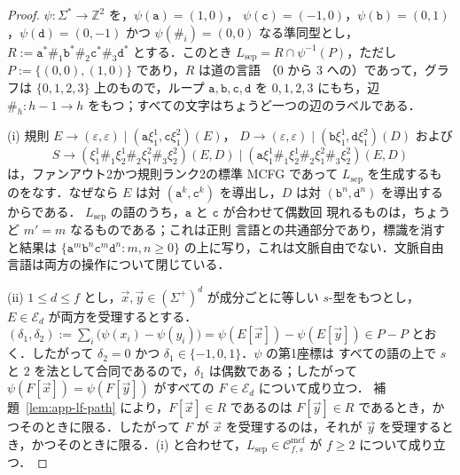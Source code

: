 \documentclass[11pt,a4paper]{ltjsarticle}
\numberwithin{equation}{section}
\theoremstyle{plain}
\theoremstyle{definition}
\theoremstyle{remark}
\newcommand{\Cmcf}[2]{\mathcal{C}^{\mathrm{mcf}}_{#1,#2}}
\newcommand{\tuple}[1]{\vec{#1}}
\newcommand{\eps}{\varepsilon}
\theoremstyle{plain}
\begin{document}
\begin{proof}
$\psi:\Sigma^*\to\mathbb Z^2$ を，$\psi(\mathtt a)=(1,0)$，
$\psi(\mathtt c)=(-1,0)$，$\psi(\mathtt b)=(0,1)$，$\psi(\mathtt d)=(0,-1)$ かつ
$\psi(\mathtt\#_i)=(0,0)$ なる準同型とし，
$R:=\mathtt a^*\mathtt\#_1\mathtt b^*\mathtt\#_2\mathtt c^*\mathtt\#_3\mathtt d^*$ とする．このとき
$L_{\mathrm{sep}}=R\cap\psi^{-1}(P)$，ただし $P:=\{(0,0),(1,0)\}$ であり，$R$ は道の言語
（$0$ から $3$ への）であって，グラフは $\{0,1,2,3\}$ 上のもので，ループ $\mathtt a,\mathtt b,\mathtt c,\mathtt d$
を $0,1,2,3$ にもち，辺 $\mathtt\#_h:h-1\to h$ をもつ；すべての文字はちょうど一つの辺のラベルである．

(i) 規則 $E\to(\eps,\eps)\mid(\mathtt a\xi_1^1,\mathtt c\xi_1^2)(E)$，
$D\to(\eps,\eps)\mid(\mathtt b\xi_1^1,\mathtt d\xi_1^2)(D)$ および
\[
 S\to(\xi_1^1\mathtt\#_1\xi_2^1\mathtt\#_2\xi_1^2\mathtt\#_3\xi_2^2)(E,D)\mid
 (\mathtt a\xi_1^1\mathtt\#_1\xi_2^1\mathtt\#_2\xi_1^2\mathtt\#_3\xi_2^2)(E,D)
\]
は，ファンアウト2かつ規則ランク2の標準 MCFG であって $L_{\mathrm{sep}}$ を生成するものをなす．なぜなら $E$
は対 $(\mathtt a^k,\mathtt c^k)$ を導出し，$D$ は対 $(\mathtt b^n,\mathtt d^n)$ を導出するからである．
$L_{\mathrm{sep}}$ の語のうち，$\mathtt a$ と $\mathtt c$ が合わせて偶数回
現れるものは，ちょうど $m'=m$ なるものである；これは正則
言語との共通部分であり，標識を消すと結果は
$\{\mathtt a^m\mathtt b^n\mathtt c^m\mathtt d^n:m,n\ge0\}$ の上に写り，これは文脈自由でない．文脈自由
言語は両方の操作について閉じている．

(ii) $1\le d\le f$ とし，$\tuple x,\tuple y\in(\Sigma^+)^d$ が成分ごとに等しい
$s$-型をもつとし，$E\in\mathcal E_d$ が両方を受理するとする．
$(\delta_1,\delta_2):=\sum_i\bigl(\psi(x_i)-\psi(y_i)\bigr)=\psi(E[\tuple x])-\psi(E[\tuple y])
\in P-P$ とおく．したがって $\delta_2=0$ かつ $\delta_1\in\{-1,0,1\}$．$\psi$ の第1座標は
すべての語の上で $s$ と $2$ を法として合同であるので，$\delta_1$ は偶数である；したがって
$\psi(F[\tuple x])=\psi(F[\tuple y])$ がすべての $F\in\mathcal E_d$ について成り立つ．
補題~\ref{lem:app-lf-path} により，$F[\tuple x]\in R$ であるのは $F[\tuple y]\in R$ であるとき，かつそのときに限る．したがって $F$ が
$\tuple x$ を受理するのは，それが $\tuple y$ を受理するとき，かつそのときに限る．(i) と合わせて，$L_{\mathrm{sep}}\in\Cmcf{f}{s}$ が $f\ge2$ について成り立つ．


\end{proof}
\end{document}
